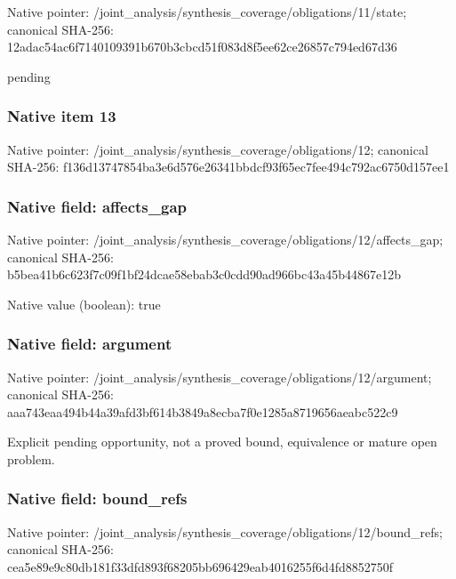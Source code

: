 \documentclass[10pt,a4paper]{article}
\begin{document}
Native pointer: /joint\_analysis/synthesi\allowbreak{}s\_coverage/obligations/1\allowbreak{}1/state; canonical SHA-256: 12adac54ac6f7140109391b6\allowbreak{}70b3cbcd51f083d8f5ee62ce\allowbreak{}26857c794ed67d36


pending


\subsubsection{Native item 13}


Native pointer: /joint\_analysis/synthesi\allowbreak{}s\_coverage/obligations/1\allowbreak{}2; canonical SHA-256: f136d13747854ba3e6d576e2\allowbreak{}6341bbdcf93f65ec7fee494c\allowbreak{}792ac6750d157ee1



\subsubsection{Native field: affects\_gap}


Native pointer: /joint\_analysis/synthesi\allowbreak{}s\_coverage/obligations/1\allowbreak{}2/affects\_gap; canonical SHA-256: b5bea41b6c623f7c09f1bf24\allowbreak{}dcae58ebab3c0cdd90ad966b\allowbreak{}c43a45b44867e12b



Native value (boolean): true



\subsubsection{Native field: argument}


Native pointer: /joint\_analysis/synthesi\allowbreak{}s\_coverage/obligations/1\allowbreak{}2/argument; canonical SHA-256: aaa743eaa494b44a39afd3bf\allowbreak{}614b3849a8ecba7f0e1285a8\allowbreak{}719656aeabc522c9


Explicit pending opportunity, not a proved bound, equivalence or mature open problem.


\subsubsection{Native field: bound\_refs}


Native pointer: /joint\_analysis/synthesi\allowbreak{}s\_coverage/obligations/1\allowbreak{}2/bound\_refs; canonical SHA-256: cea5e89e9c80db181f33dfd8\allowbreak{}93f68205bb696429eab40162\allowbreak{}55f6d4fd8852750f
\end{document}
